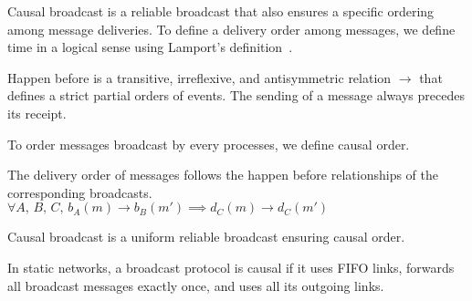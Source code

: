 Causal broadcast is a reliable broadcast that also ensures a specific ordering
among message deliveries.  To define a delivery order among messages, we define
time in a logical sense using Lamport's definition~\cite{lamport1978time}.

\begin{definition}
  Happen before is a transitive, irreflexive, and antisymmetric relation
  $\rightarrow$ that defines a strict partial orders of events.  The sending of
  a message always precedes its receipt.
\end{definition}





To order messages broadcast by every processes, we define causal order.

\begin{definition}
  The delivery order of messages follows the happen before relationships of the
  corresponding broadcasts. $\forall A,\,B,\,C,\,
  b_A(m) \rightarrow b_B(m') \implies d_C(m) \rightarrow d_C(m')$
\end{definition}


\begin{definition}
  Causal broadcast is a uniform reliable broadcast ensuring causal order.
\end{definition}

\begin{theorem}
  In static networks, a broadcast protocol is causal if it uses FIFO links,
  forwards all broadcast messages exactly once, and uses all its outgoing links.
\end{theorem}

